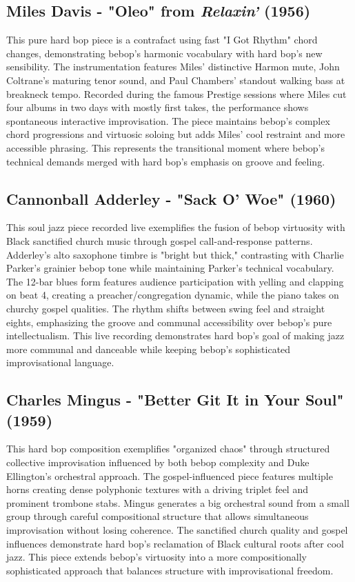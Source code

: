 \documentclass[11pt]{article}
\begin{document}
\subsection*{Miles Davis - "Oleo" from \emph{Relaxin'} (1956)}
This pure hard bop piece is a contrafact using fast "I Got Rhythm" chord changes, demonstrating bebop's harmonic vocabulary with hard bop's new sensibility. The instrumentation features Miles' distinctive Harmon mute, John Coltrane's maturing tenor sound, and Paul Chambers' standout walking bass at breakneck tempo. Recorded during the famous Prestige sessions where Miles cut four albums in two days with mostly first takes, the performance shows spontaneous interactive improvisation. The piece maintains bebop's complex chord progressions and virtuosic soloing but adds Miles' cool restraint and more accessible phrasing. This represents the transitional moment where bebop's technical demands merged with hard bop's emphasis on groove and feeling.

\subsection*{Cannonball Adderley - "Sack O' Woe" (1960)}
This soul jazz piece recorded live exemplifies the fusion of bebop virtuosity with Black sanctified church music through gospel call-and-response patterns. Adderley's alto saxophone timbre is "bright but thick," contrasting with Charlie Parker's grainier bebop tone while maintaining Parker's technical vocabulary. The 12-bar blues form features audience participation with yelling and clapping on beat 4, creating a preacher/congregation dynamic, while the piano takes on churchy gospel qualities. The rhythm shifts between swing feel and straight eights, emphasizing the groove and communal accessibility over bebop's pure intellectualism. This live recording demonstrates hard bop's goal of making jazz more communal and danceable while keeping bebop's sophisticated improvisational language.

\subsection*{Charles Mingus - "Better Git It in Your Soul" (1959)}
This hard bop composition exemplifies "organized chaos" through structured collective improvisation influenced by both bebop complexity and Duke Ellington's orchestral approach. The gospel-influenced piece features multiple horns creating dense polyphonic textures with a driving triplet feel and prominent trombone stabs. Mingus generates a big orchestral sound from a small group through careful compositional structure that allows simultaneous improvisation without losing coherence. The sanctified church quality and gospel influences demonstrate hard bop's reclamation of Black cultural roots after cool jazz. This piece extends bebop's virtuosity into a more compositionally sophisticated approach that balances structure with improvisational freedom.
\end{document}
